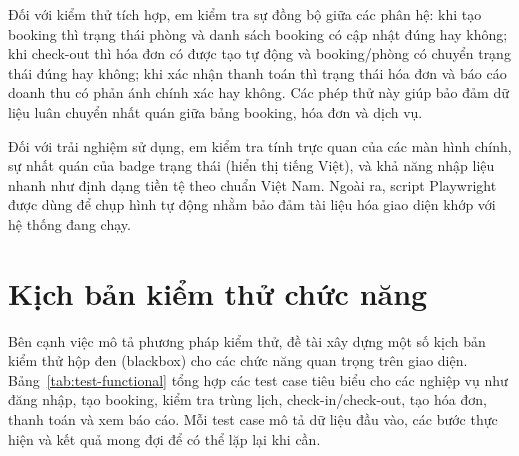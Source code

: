 \documentclass[13pt,a4paper]{extreport}
\begin{document}
Đối với kiểm thử tích hợp, em kiểm tra sự đồng bộ giữa các phân hệ: khi tạo booking thì trạng thái phòng và danh sách booking có cập nhật đúng hay không; khi check-out thì hóa đơn có được tạo tự động và booking/phòng có chuyển trạng thái đúng hay không; khi xác nhận thanh toán thì trạng thái hóa đơn và báo cáo doanh thu có phản ánh chính xác hay không. Các phép thử này giúp bảo đảm dữ liệu luân chuyển nhất quán giữa bảng booking, hóa đơn và dịch vụ.

Đối với trải nghiệm sử dụng, em kiểm tra tính trực quan của các màn hình chính, sự nhất quán của badge trạng thái (hiển thị tiếng Việt), và khả năng nhập liệu nhanh như định dạng tiền tệ theo chuẩn Việt Nam. Ngoài ra, script Playwright được dùng để chụp hình tự động nhằm bảo đảm tài liệu hóa giao diện khớp với hệ thống đang chạy.

\section{Kịch bản kiểm thử chức năng}

Bên cạnh việc mô tả phương pháp kiểm thử, đề tài xây dựng một số kịch bản kiểm thử hộp đen (blackbox) cho các chức năng quan trọng trên giao diện. Bảng~\ref{tab:test-functional} tổng hợp các test case tiêu biểu cho các nghiệp vụ như đăng nhập, tạo booking, kiểm tra trùng lịch, check-in/check-out, tạo hóa đơn, thanh toán và xem báo cáo. Mỗi test case mô tả dữ liệu đầu vào, các bước thực hiện và kết quả mong đợi để có thể lặp lại khi cần.
\end{document}
